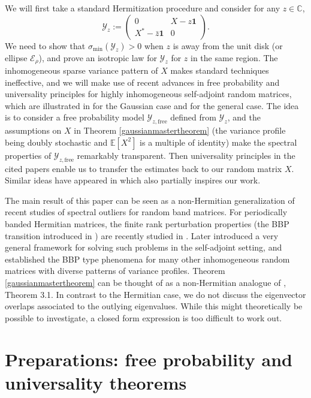 \documentclass[11pt,reqno]{amsart}
\theoremstyle{plain}
\theoremstyle{remark}
\numberwithin{equation}{section}
\begin{document}
We will first take a standard Hermitization procedure and consider for any $z\in\mathbb{C}$, $$
\mathcal{Y}_z:=\begin{pmatrix}
    0& X-z\mathbf{1}\\X^*-\bar{z}\mathbf{1}&0
\end{pmatrix}.
$$
 We need to show that $\sigma_{\min}(\mathcal{Y}_z)>0$ when $z$ is away from the unit disk (or ellipse $\mathcal{E}_{\rho}$), and prove an isotropic law for $\mathcal{Y}_z$ for $z$ in the same region. The inhomogeneous sparse variance pattern of $X$ makes standard techniques ineffective, and we will make use of recent advances in free probability and universality principles for highly inhomogeneous self-adjoint random matrices, which are illustrated in \cite{bandeira2023matrix} for the Gaussian case and \cite{brailovskaya2022universality} for the general case. The idea is to consider a free probability model $\mathcal{Y}_{z,\text{free}}$ defined from $\mathcal{Y}_z$, and the assumptions on $X$ in Theorem \ref{gaussianmastertheorem} (the variance profile being doubly stochastic and $\mathbb{E}[X^2]$ is a multiple of identity) make the spectral properties of $\mathcal{Y}_{z,\text{free}}$ remarkably transparent. Then universality principles in the cited papers enable us to transfer the estimates back to our random matrix $X$. Similar ideas have appeared in \cite{shou2024localization} which also partially inspires our work.
 

The main result of this paper can be seen as a non-Hermitian generalization of recent studies of spectral outliers for random band matrices. For periodically banded Hermitian matrices, the finite rank perturbation properties (the BBP transition introduced in \cite{peche2006largest}) are recently studied in \cite{au2023bbp}. Later \cite{bandeira2024matrix} introduced a very general framework for solving such problems in the self-adjoint setting, and established the BBP type phenomena for many other inhomogeneous random matrices with diverse patterns of variance profiles. Theorem \ref{gaussianmastertheorem} can be thought of as a non-Hermitian analogue of \cite{bandeira2024matrix}, Theorem 3.1. In contrast to the Hermitian case, we do not discuss the eigenvector overlaps associated to the outlying eigenvalues. While this might theoretically be possible to investigate, a closed form expression is too difficult to work out.



\section{Preparations: free probability and universality theorems}
\label{proof outlines}
\end{document}
